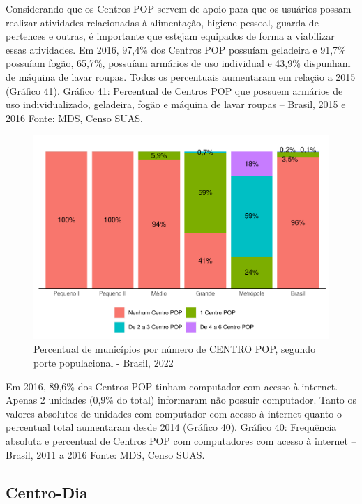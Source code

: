 \documentclass[
  brazilian]{report}
\begin{document}
Considerando que os Centros POP servem de apoio para que os usuários
possam realizar atividades relacionadas à alimentação, higiene pessoal,
guarda de pertences e outras, é importante que estejam equipados de
forma a viabilizar essas atividades. Em 2016, 97,4\% dos Centros POP
possuíam geladeira e 91,7\% possuíam fogão, 65,7\%, possuíam armários de
uso individual e 43,9\% dispunham de máquina de lavar roupas. Todos os
percentuais aumentaram em relação a 2015 (Gráfico 41). Gráfico 41:
Percentual de Centros POP que possuem armários de uso individualizado,
geladeira, fogão e máquina de lavar roupas -- Brasil, 2015 e 2016 Fonte:
MDS, Censo SUAS.

\begin{figure}
\includegraphics{Censo-SUAS-2022_files/figure-latex/cpop-porte-1} \caption[Percentual de municípios por número de CENTRO POP, segundo porte populacional - Brasil, 2022]{Percentual de municípios por número de CENTRO POP, segundo porte populacional - Brasil, 2022}\label{fig:cpop-porte}
\end{figure}

Em 2016, 89,6\% dos Centros POP tinham computador com acesso à internet.
Apenas 2 unidades (0,9\% do total) informaram não possuir computador.
Tanto os valores absolutos de unidades com computador com acesso à
internet quanto o percentual total aumentaram desde 2014 (Gráfico 40).
Gráfico 40: Frequência absoluta e percentual de Centros POP com
computadores com acesso à internet -- Brasil, 2011 a 2016 Fonte: MDS,
Censo SUAS.

\hypertarget{centro-dia}{%
\subsection{Centro-Dia}\label{centro-dia}}
\end{document}
